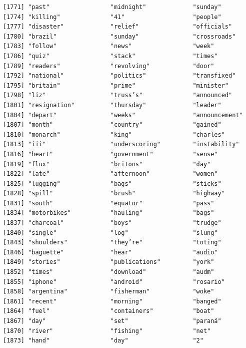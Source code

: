 \documentclass[
  letterpaper,
  DIV=11,
  numbers=noendperiod]{scrartcl}
\begin{document}
\begin{verbatim}
[1771] "past"                 "midnight"             "sunday"              
[1774] "killing"              "41"                   "people"              
[1777] "disaster"             "relief"               "officials"           
[1780] "brazil"               "sunday"               "crossroads"          
[1783] "follow"               "news"                 "week"                
[1786] "quiz"                 "stack"                "times"               
[1789] "readers"              "revolving"            "door"                
[1792] "national"             "politics"             "transfixed"          
[1795] "britain"              "prime"                "minister"            
[1798] "liz"                  "truss’s"              "announced"           
[1801] "resignation"          "thursday"             "leader"              
[1804] "depart"               "weeks"                "announcement"        
[1807] "month"                "country"              "gained"              
[1810] "monarch"              "king"                 "charles"             
[1813] "iii"                  "underscoring"         "instability"         
[1816] "heart"                "government"           "sense"               
[1819] "flux"                 "britons"              "day"                 
[1822] "late"                 "afternoon"            "women"               
[1825] "lugging"              "bags"                 "sticks"              
[1828] "spill"                "brush"                "highway"             
[1831] "south"                "equator"              "pass"                
[1834] "motorbikes"           "hauling"              "bags"                
[1837] "charcoal"             "boys"                 "trudge"              
[1840] "single"               "log"                  "slung"               
[1843] "shoulders"            "they’re"              "toting"              
[1846] "baguette"             "hear"                 "audio"               
[1849] "stories"              "publications"         "york"                
[1852] "times"                "download"             "audm"                
[1855] "iphone"               "android"              "rosario"             
[1858] "argentina"            "fisherman"            "woke"                
[1861] "recent"               "morning"              "banged"              
[1864] "fuel"                 "containers"           "boat"                
[1867] "day"                  "set"                  "paraná"              
[1870] "river"                "fishing"              "net"                 
[1873] "hand"                 "day"                  "2"                   

\end{verbatim}
\end{document}
